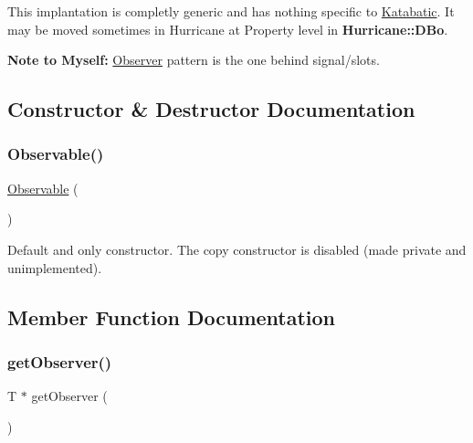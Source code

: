 This implantation is completly generic and has nothing specific to \hyperlink{namespaceKatabatic}{Katabatic}. It may be moved sometimes in Hurricane at Property level in \textbf{ Hurricane\+::\+D\+Bo}.

{\bfseries Note to Myself\+:} \hyperlink{classKatabatic_1_1Observer}{Observer} pattern is the one behind signal/slots. 

\subsection{Constructor \& Destructor Documentation}
\mbox{\label{classKatabatic_1_1Observable_a6438e92e07db169a97ed3eba36788dc4}} 
\subsubsection{\texorpdfstring{Observable()}{Observable()}}
{\footnotesize\ttfamily \hyperlink{classKatabatic_1_1Observable}{Observable} (\begin{DoxyParamCaption}{ }\end{DoxyParamCaption})\hspace{0.3cm}{\ttfamily [inline]}}

Default and only constructor. The copy constructor is disabled (made private and unimplemented). 

\subsection{Member Function Documentation}
\mbox{\label{classKatabatic_1_1Observable_acc0b7276e09628f2b101ecf751aacd2a}} 
\subsubsection{\texorpdfstring{get\+Observer()}{getObserver()}}
{\footnotesize\ttfamily T $\ast$ get\+Observer (\begin{DoxyParamCaption}{ }\end{DoxyParamCaption})\hspace{0.3cm}{\ttfamily [inline]}}

